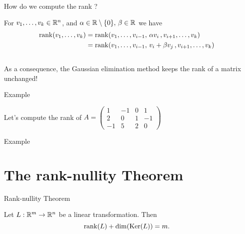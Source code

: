 \documentclass{beamer}
\begin{document}
\begin{frame}[t]{How do we compute the rank ?}
	\grid

	For $v_1, \dots, v_k \in \mathbb{R}^n$, and $\alpha \in \mathbb{R} \setminus \{0\}, \, \beta \in \mathbb{R}$ we have
	{
		\begin{align*}
			{{\rm rank}}(v_1, \dots, v_k)
		&=
		{{\rm rank}}(v_1, \dots, v_{i-1}, \, \alpha v_i \, , v_{i+1}, \dots, v_k)\\
		&=
		{{\rm rank}}(v_1, \dots, v_{i-1}, \, v_i + \beta v_j \, , v_{i+1}, \dots, v_k)
		\end{align*}
	}
	\vspace{2cm}
	\\
	As a consequence, the Gaussian elimination method keeps the rank of a matrix unchanged!
\end{frame}
\begin{frame}[t]{Example}
	\grid

	Let's compute the rank of \quad
	$\displaystyle
	A = 
	\begin{pmatrix}
		1  & -1 & 0 & 1 \\
		2  & 0 & 1 & -1 \\
		-1  & 5 & 2 & 0 
	\end{pmatrix}
	$

\end{frame}
\begin{frame}[t]{Example}
	\grid

\end{frame}

\section{The rank-nullity Theorem}
\begin{frame}[t]{Rank-nullity Theorem}
	\grid

	\vspace{-0.3cm}
	\begin{theorem}
		Let $L: \mathbb{R}^m \to \mathbb{R}^n$ be a linear transformation. Then
		$$
		{{\rm rank}}(L) + {{\rm dim}}({{\rm Ker}}(L)) = m.
		$$
	\end{theorem}

\end{frame}
\end{document}
